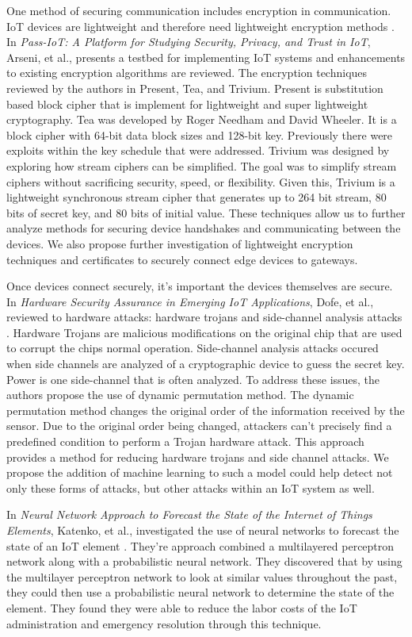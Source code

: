 \documentclass[../main.tex]{subfiles}
\begin{document}
One method of securing communication includes encryption in communication. IoT devices are lightweight and therefore need lightweight encryption methods \cite{7528258}. In \textit{Pass-IoT: A Platform for Studying Security, Privacy, and Trust in IoT}, Arseni, et al., presents a testbed for implementing IoT systems and enhancements to existing encryption algorithms are reviewed. The encryption techniques reviewed by the authors in Present, Tea, and Trivium. Present is substitution based block cipher that is implement for lightweight and super lightweight cryptography. Tea was developed by Roger Needham and David Wheeler. It is a block cipher with 64-bit data block sizes and 128-bit key. Previously there were exploits within the key schedule that were addressed. Trivium was designed by exploring how stream ciphers can be simplified. The goal was to simplify stream ciphers without sacrificing security, speed, or flexibility. Given this, Trivium is a lightweight synchronous stream cipher that generates up to 264 bit stream, 80 bits of secret key, and 80 bits of initial value. These techniques allow us to further analyze methods for securing device handshakes and communicating between the devices. We also propose further investigation of lightweight encryption techniques and certificates to securely connect edge devices to gateways. 

Once devices connect securely, it's important the devices themselves are secure. In \textit{Hardware Security Assurance in Emerging IoT Applications}, Dofe, et al., reviewed to hardware attacks: hardware trojans and side-channel analysis attacks \cite{7538981}. Hardware Trojans are malicious modifications on the original chip that are used to corrupt the chips normal operation. Side-channel analysis attacks occured when side channels are analyzed of a cryptographic device to guess the secret key. Power is one side-channel that is often analyzed. To address these issues, the authors propose the use of dynamic permutation method. The dynamic permutation method changes the original order of the information received by the sensor. Due to the original order being changed, attackers can't precisely find a predefined condition to perform a Trojan hardware attack. This approach provides a method for reducing hardware trojans and side channel attacks. We propose the addition of machine learning to such a model could help detect not only these forms of attacks, but other attacks within an IoT system as well.


In \textit{Neural Network Approach to Forecast the State of the Internet of Things Elements}, Katenko, et al., investigated the use of neural networks to forecast the state of an IoT element \cite{7190434}. They're approach combined a multilayered perceptron network along with a probabilistic neural network. They discovered that by using the multilayer perceptron network to look at similar values throughout the past, they could then use a probabilistic neural network to determine the state of the element. They found they were able to reduce the labor costs of the IoT administration and emergency resolution through this technique. 
\end{document}

